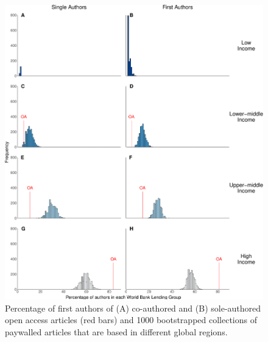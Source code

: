 \documentclass[english,man]{apa6}
\begin{document}
\begin{figure}

{\centering \includegraphics{Smith_etal_APC_ms_files/figure-latex/Fig6-1} 

}

\caption{Percentage of first authors of (A) co-authored and (B) sole-authored open access articles (red bars) and 1000 bootstrapped collections of paywalled articles that are based in different global regions.}\label{fig:Fig6}
\end{figure}
\end{document}
